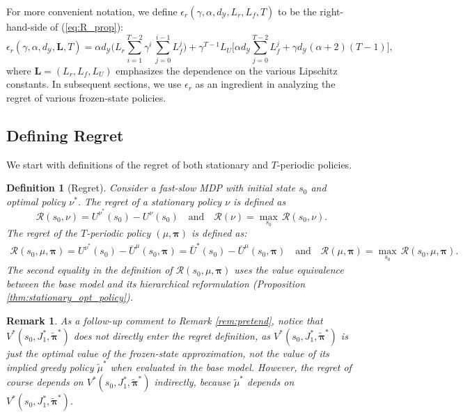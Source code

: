 \documentclass[11pt, notitlepage]{article}
\newcommand{\1}{\mathbbm{1}}
\newtheorem{remark}{Remark}
\newtheorem{definition}{Definition}
\begin{document}
For more convenient notation, we define $\epsilon_r(\gamma,\alpha,d_\mathcal{Y},L_r,L_f,T)$ to be the right-hand-side of (\ref{eq:R_prop}):
\[
\epsilon_r(\gamma,\alpha,d_\mathcal{Y},\mathbf{L},T) =\alpha d_\mathcal{Y} \biggl( L_r \sum_{i=1}^{T-2} \gamma^i \, \sum_{j=0}^{i-1} L_f^j \biggr) + \gamma^{T-1} L_U \Biggl[ \alpha d_\mathcal{Y} \sum_{j=0}^{T-2} L_f^j + \gamma d_\mathcal{Y} (\alpha + 2) (T-1)\Biggr],
\]
where $\mathbf{L} = (L_r, L_f, L_U)$ emphasizes the dependence on the various Lipschitz constants.
In subsequent sections, we use $\epsilon_r$ as an ingredient in analyzing the regret of various frozen-state policies.


\subsection{Defining Regret}
\label{sec:defn_regret}
We start with definitions of the regret of both stationary and $T$-periodic policies. %

\begin{definition}[Regret]
Consider a fast-slow MDP with initial state $s_0$ and optimal policy $\nu^*$. The regret of a stationary policy $\nu$ is defined as  
\[
\mathcal{R}(s_0, \nu) = U^{\nu^*}(s_0) - U^{\nu}(s_0) \quad \text{and} \quad \mathcal R(\nu) = \max_{s_0} \, \mathcal{R}(s_0, \nu).
\] The regret of the $T$-periodic policy $(\mu, \boldsymbol{\pi})$ is defined as:
\begin{align*}
\mathcal{R}(s_0, \mu, \boldsymbol{\pi}) = U^{\nu^*}(s_0) - \bar{U}^{\mu}(s_0, \boldsymbol{\pi}) = \bar{U}^{*}(s_0) - \bar{U}^{\mu}(s_0, \boldsymbol{\pi}) \quad \text{and} \quad \mathcal R(\mu, \boldsymbol{\pi}) = \max_{s_0} \, \mathcal{R}(s_0, \mu, \boldsymbol{\pi}).
\end{align*}
The second equality in the definition of $\mathcal{R}(s_0, \mu, \boldsymbol{\pi})$ uses the value equivalence between the base model and its hierarchical reformulation (Proposition \ref{thm:stationary_opt_policy}).
\end{definition}

\begin{remark}
As a follow-up comment to Remark \ref{rem:pretend}, notice that $V^*(s_0,J_1^*,\tilde{\boldsymbol{\pi}}^*)$ does not directly enter the regret definition, as $V^*(s_0,J_1^*,\tilde{\boldsymbol{\pi}}^*)$ is just the optimal value of the frozen-state approximation, not the value of its implied greedy policy $\tilde{\mu}^*$ when evaluated in the base model. However, the regret of course depends on $V^*(s_0,J_1^*,\tilde{\boldsymbol{\pi}}^*)$ indirectly, because $\tilde{\mu}^*$ depends on $V^*(s_0,J_1^*,\tilde{\boldsymbol{\pi}}^*)$.
\end{remark}
\end{document}
